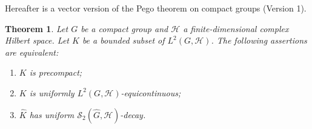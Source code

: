 \documentclass[11pt]{amsart}
\newtheorem{theorem}{Theorem}[section]
\begin{document}
Hereafter is a vector version of the Pego theorem on compact groups (Version 1). 
 
\begin{theorem}\label{thm:main}
Let $G$ be a compact group and  $\mathcal{H}$ a finite-dimensional complex Hilbert space. Let  $K$ be a bounded subset of
$L^2(G,\mathcal{H})$. The following assertions are equivalent: 
\begin{enumerate}
\item[(i)] $K$ is precompact;
\item[(ii)] $K$ is uniformly $L^2(G,\mathcal{H})$-equicontinuous;
\item[(iii)] $\widehat K$ has uniform
$\mathscr{S}_2(\widehat{G},\mathcal{H})$-decay.
\end{enumerate}
\end{theorem}
\end{document}
